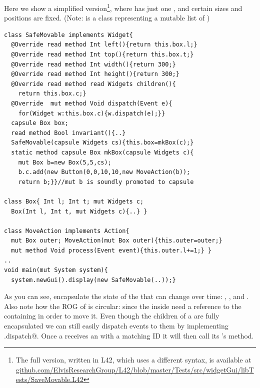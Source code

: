 

Here we show a simplified version\footnote{The full version, written in L42, which uses a different syntax, is available at \url{github.com/ElvisResearchGroup/L42/blob/master/Tests/src/widgetGui/libTests/SaveMovable.L42}}, where  \Q@SafeMovable@ has just one \Q@Button@, and certain sizes and positions are fixed. (Note: \Q@Widgets@ is a class representing a mutable list of \Q@mut@ \Q@Widget@s)
\begin{lstlisting}
class SafeMovable implements Widget{
  @Override read method Int left(){return this.box.l;}
  @Override read method Int top(){return this.box.t;}
  @Override read method Int width(){return 300;}
  @Override read method Int height(){return 300;}
  @Override read method read Widgets children(){
    return this.box.c;}
  @Override  mut method Void dispatch(Event e){
    for(Widget w:this.box.c){w.dispatch(e);}}
  capsule Box box;
  read method Bool invariant(){..}
  SafeMovable(capsule Widgets cs){this.box=mkBox(c);}
  static method capsule Box mkBox(capsule Widgets c){
    mut Box b=new Box(5,5,cs);
    b.c.add(new Button(0,0,10,10,new MoveAction(b));
    return b;}}//mut b is soundly promoted to capsule

class Box{ Int l; Int t; mut Widgets c;
  Box(Int l, Int t, mut Widgets c){..} }

class MoveAction implements Action{
  mut Box outer; MoveAction(mut Box outer){this.outer=outer;}
  mut method Void process(Event event){this.outer.l+=1;} }
..
void main(mut System system){
  system.newGui().display(new SafeMovable(..));}
\end{lstlisting}

As you can see, \Q@Box@es encapsulate the state of the \Q@SafeMovable@s that can change over time:
\Q@left@, \Q@top@, and \Q@children@. Also note how the ROG of \Q@Box@ is circular: since
the \Q@MoveAction@s inside \Q@Button@s need a reference to the containing \Q@Box@ in order to move it.
Even though the children of a \Q@SafeMovable@ are fully encapsulated we can still easily dispatch events to them by implementing \Q@Widget.dispatch@. Once a \Q@Button@ receives an \Q@Event@ with a matching ID it will then call its \Q@Action@'s \Q@process@ method. 


